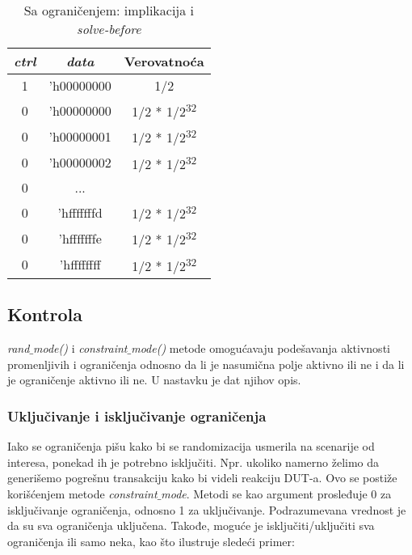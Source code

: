 \begin{table}[!htb]
  \centering
  \begin{tabular}{|c|c|c|}\hline
    \textbf{\emph{ctrl}}&\textbf{\emph{data}}&\textbf{Verovatnoća} \\ \hline
    1&'h00000000&1/2 \\ \hline
    0&'h00000000&1/2 * 1/2\textsuperscript{32} \\ \hline
    0&'h00000001&1/2 * 1/2\textsuperscript{32} \\ \hline
    0&'h00000002&1/2 * 1/2\textsuperscript{32} \\ \hline
    0&...& \\ \hline
    0&'hfffffffd&1/2 * 1/2\textsuperscript{32} \\ \hline
    0&'hfffffffe&1/2 * 1/2\textsuperscript{32} \\ \hline
    0&'hffffffff&1/2 * 1/2\textsuperscript{32} \\ \hline
  \end{tabular}
  \caption{Sa ograničenjem: implikacija i \emph{solve-before}}\label{tab:solve_before}
\end{table}


\subsection{Kontrola}

\emph{rand\(\_\)mode()} i \emph{constraint\(\_\)mode()} metode omogućavaju
podešavanja aktivnosti promenljivih i ograničenja odnosno da li je nasumična
polje aktivno ili ne i da li je ograničenje aktivno ili ne.
U nastavku je dat njihov opis.

\subsubsection{Uključivanje i isključivanje ograničenja}

Iako se ograničenja pišu kako bi se randomizacija usmerila na scenarije od
interesa, ponekad ih je potrebno isključiti. Npr. ukoliko namerno želimo da
generišemo pogrešnu transakciju kako bi videli reakciju DUT-a. Ovo se postiže
korišćenjem metode \emph{constraint\(\_\)mode}. Metodi se kao argument
prosleđuje 0 za isključivanje ograničenja, odnosno 1 za uključivanje.
Podrazumevana vrednost je da su sva ograničenja uključena. Takođe, moguće je
isključiti/uključiti sva ograničenja ili samo neka, kao što ilustruje sledeći
primer:

